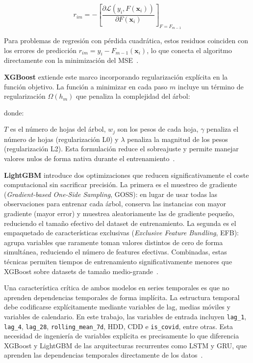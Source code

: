 \documentclass[12pt, a4paper]{article}
\begin{document}
\begin{equation}
r_{im} = -\left[\frac{\partial \mathcal{L}(y_i, F(\mathbf{x}_i))}{\partial F(\mathbf{x}_i)}\right]_{F=F_{m-1}}
\end{equation}


Para problemas de regresión con pérdida cuadrática, estos residuos coinciden con los errores de predicción $r_{im} = y_i - F_{m-1}(\mathbf{x}_i)$, lo que conecta el algoritmo directamente con la minimización del MSE~\cite{chen2016}.

\textbf{XGBoost} extiende este marco incorporando regularización explícita en la función objetivo. La función a minimizar en cada paso $m$ incluye un término de regularización $\Omega(h_m)$ que penaliza la complejidad del árbol:

donde:

$T$ es el número de hojas del árbol, $w_j$ son los pesos de cada hoja, $\gamma$ penaliza el número de hojas (regularización L0) y $\lambda$ penaliza la magnitud de los pesos (regularización L2). Esta formulación reduce el sobreajuste y permite manejar valores nulos de forma nativa durante el entrenamiento~\cite{chen2016}.

\textbf{LightGBM} introduce dos optimizaciones que reducen significativamente el coste computacional sin sacrificar precisión. La primera es el muestreo de gradiente (\textit{Gradient-based One-Side Sampling}, GOSS): en lugar de usar todas las observaciones para entrenar cada árbol, conserva las instancias con mayor gradiente (mayor error) y muestrea aleatoriamente las de gradiente pequeño, reduciendo el tamaño efectivo del dataset de entrenamiento. La segunda es el empaquetado de características exclusivas (\textit{Exclusive Feature Bundling}, EFB): agrupa variables que raramente toman valores distintos de cero de forma simultánea, reduciendo el número de features efectivas. Combinadas, estas técnicas permiten tiempos de entrenamiento significativamente menores que XGBoost sobre datasets de tamaño medio-grande~\cite{ke2017}.

Una característica crítica de ambos modelos en series temporales es que no aprenden dependencias temporales de forma implícita. La estructura temporal debe codificarse explícitamente mediante variables de lag, medias móviles y variables de calendario. En este trabajo, las variables de entrada incluyen \texttt{lag\_1}, \texttt{lag\_4}, \texttt{lag\_28}, \texttt{rolling\_mean\_7d}, HDD, CDD e \texttt{is\_covid}, entre otras. Esta necesidad de ingeniería de variables explícita es precisamente lo que diferencia XGBoost y LightGBM de las arquitecturas recurrentes como LSTM y GRU, que aprenden las dependencias temporales directamente de los datos~\cite{jiang2024, chen2016, ke2017}.
\end{document}
